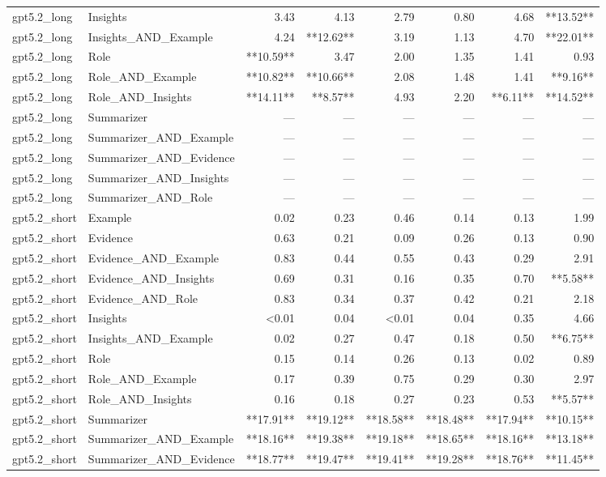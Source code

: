 \begin{tabular}{llrrrrrr}
gpt5.2_long & Insights & 3.43 & 4.13 & 2.79 & 0.80 & 4.68 & **13.52** \\
gpt5.2_long & Insights_AND_Example & 4.24 & **12.62** & 3.19 & 1.13 & 4.70 & **22.01** \\
gpt5.2_long & Role & **10.59** & 3.47 & 2.00 & 1.35 & 1.41 & 0.93 \\
gpt5.2_long & Role_AND_Example & **10.82** & **10.66** & 2.08 & 1.48 & 1.41 & **9.16** \\
gpt5.2_long & Role_AND_Insights & **14.11** & **8.57** & 4.93 & 2.20 & **6.11** & **14.52** \\
gpt5.2_long & Summarizer & — & — & — & — & — & — \\
gpt5.2_long & Summarizer_AND_Example & — & — & — & — & — & — \\
gpt5.2_long & Summarizer_AND_Evidence & — & — & — & — & — & — \\
gpt5.2_long & Summarizer_AND_Insights & — & — & — & — & — & — \\
gpt5.2_long & Summarizer_AND_Role & — & — & — & — & — & — \\
gpt5.2_short & Example & 0.02 & 0.23 & 0.46 & 0.14 & 0.13 & 1.99 \\
gpt5.2_short & Evidence & 0.63 & 0.21 & 0.09 & 0.26 & 0.13 & 0.90 \\
gpt5.2_short & Evidence_AND_Example & 0.83 & 0.44 & 0.55 & 0.43 & 0.29 & 2.91 \\
gpt5.2_short & Evidence_AND_Insights & 0.69 & 0.31 & 0.16 & 0.35 & 0.70 & **5.58** \\
gpt5.2_short & Evidence_AND_Role & 0.83 & 0.34 & 0.37 & 0.42 & 0.21 & 2.18 \\
gpt5.2_short & Insights & <0.01 & 0.04 & <0.01 & 0.04 & 0.35 & 4.66 \\
gpt5.2_short & Insights_AND_Example & 0.02 & 0.27 & 0.47 & 0.18 & 0.50 & **6.75** \\
gpt5.2_short & Role & 0.15 & 0.14 & 0.26 & 0.13 & 0.02 & 0.89 \\
gpt5.2_short & Role_AND_Example & 0.17 & 0.39 & 0.75 & 0.29 & 0.30 & 2.97 \\
gpt5.2_short & Role_AND_Insights & 0.16 & 0.18 & 0.27 & 0.23 & 0.53 & **5.57** \\
gpt5.2_short & Summarizer & **17.91** & **19.12** & **18.58** & **18.48** & **17.94** & **10.15** \\
gpt5.2_short & Summarizer_AND_Example & **18.16** & **19.38** & **19.18** & **18.65** & **18.16** & **13.18** \\
gpt5.2_short & Summarizer_AND_Evidence & **18.77** & **19.47** & **19.41** & **19.28** & **18.76** & **11.45** \\

\end{tabular}
